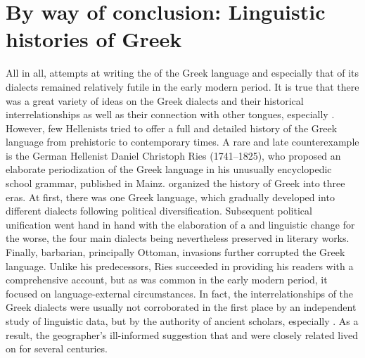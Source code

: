 \section{By way of conclusion: Linguistic histories of Greek}\label{sec:5.8}

All in all, attempts at writing the  of the Greek language and especially that of its dialects remained relatively futile in the early modern period. It is true that there was a great variety of ideas on the Greek dialects and their historical interrelationships as well as their connection with other tongues, especially . However, few Hellenists tried to offer a full and detailed history of the Greek language from prehistoric to contemporary times. A rare and late counterexample is the German Hellenist Daniel Christoph Ries (1741–1825), who proposed an elaborate periodization of the Greek language in his unusually encyclopedic school grammar, published in Mainz. \citet[199--202]{Ries1786} organized the history of Greek into three eras. At first, there was one Greek language, which gradually developed into different dialects following political diversification. Subsequent political unification went hand in hand with the elaboration of a  and linguistic change for the worse, the four main dialects being nevertheless preserved in literary works. Finally, barbarian, principally Ottoman, invasions further corrupted the Greek language. Unlike his predecessors, Ries succeeded in providing his readers with a comprehensive account, but as was common in the early modern period, it focused on language-external circumstances. In fact, the interrelationships of the Greek dialects were usually not corroborated in the first place by an independent study of linguistic data, but by the authority of ancient scholars, especially . As a result, the geographer’s ill-informed suggestion that  and  were closely related lived on for several centuries.

